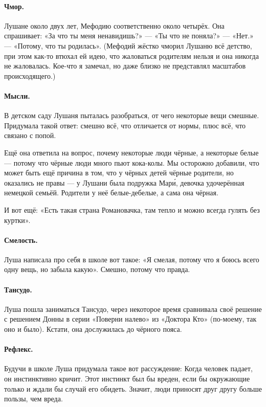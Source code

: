 \documentclass{book}
\begin{document}
\paragraph{Чмор.} Лушане около двух лет, Мефодию соответственно около четырёх.
Она спрашивает: «За что ты меня ненавидишь?» --- «Ты что не поняла?» --- «Нет.» --- «Потому, что ты родилась».
(Мефодий жёстко чморил Лушаню всё детство,
при этом как-то втюхал ей идею, что жаловаться родителям нельзя и она никогда не жаловалась.
Кое-что я замечал, но даже близко не представлял масштабов происходящего.)

\paragraph{Мысли.}
В детском саду Лушаня пыталась разобраться, от чего некоторые вещи смешные.
Придумала такой ответ: смешно всё, что отличается от нормы, плюс всё, что связано с попой.

Ещё она ответила на вопрос, почему некоторые люди чёрные, а некоторые белые --- потому что чёрные люди много пьют кока-колы.
Мы осторожно добавили, что может быть ещё причина в том, что у чёрных детей чёрные родители, но оказались не правы --- у Лушани была подружка Мар\'{и}, девочка удочерённая немецкой семьёй.
Родители у неё белые-дебелые, а сама она чёрная.

И вот ещё: «Есть такая страна Романовачка, там тепло и можно всегда гулять без куртки».

\paragraph{Смелость.} Луша написала про себя в школе вот такое:
«Я смелая, потому что я боюсь всего одну вещь, но забыла какую».
Смешно, потому что правда.

\paragraph{Тансудо.} Луша пошла заниматься Тансудо, через некоторое время сравнивала своё решение с решением Донны в серии «Поверни налево» из «Доктора Кто» (по-моему, так оно и было).
Кстати, она дослужилась до чёрного пояса.

\paragraph{Рефлекс.} Будучи в школе Луша придумала такое вот рассуждение: 
Когда человек падает, он инстинктивно кричит.
Этот инстинкт был бы вреден, если бы окружающие только и ждали бы случай его обидеть.
Значит, люди приносят друг другу больше пользы, чем вреда.
\end{document}
